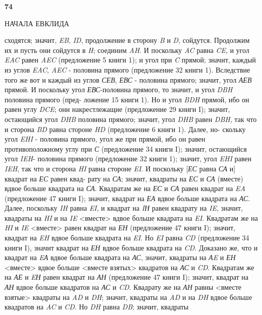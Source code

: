 \documentclass[12pt, a4paper, twoside]{article}
\begin{document}
\bf
74\\
\begin{center}
НАЧАЛА ЕВКЛИДА
\end{center}
сходятся; значит, \textit{EB}, \textit{ID}, продолжение в сторону \textit{B} и \textit{D}, сойдутся. Продолжим их и пусть они сойдутся в \textit{H}; соединим \textit{AH}. И поскольку \textit{AC} равна \textit{CE}, и угол \textit{EAC} равен \textit{AEC} (предложение 5 книги 1); и угол при \textit{C} прямой; значит, каждый из углов \textit{EAC}, \textit{AEC} - половина прямого
(предложение 32 книги 1). Вследствие того же вот и
каждый из углов \textit{СЕВ}, \textit{ЕВС} - половина прямого; значит,
угол \textit{АЕВ} прямой. И поскольку угол \textit{ЕВС}-половина
прямого, то значит, и угол \textit{DBH} половина прямого (пред-
ложение 15 книги 1). Но и угол \textit{BDH} прямой, ибо он
равен углу \textit{DCE}; они накрестлежащие (предложение 29
книги I); значит, остающийся угол \textit{DHB} половина прямого;
значит, угол \textit{DHB} равен \textit{DBH}, так что и сторона \textit{BD}
равна стороне \textit{HD} (предложение 6 книги 1). Далее, но-
скольку угол \textit{EHI} - половина прямого, угол же при
прямой, ибо он равен противоположному углу при \textit{С}
(предложение 34 книги I); значит, остающийся угол \textit{IEH}-
половина прямого (предложение 32 книги 1); значит, угол
\textit{EHI} равен \textit{IEH}, так что и сторона \textit{HI} равна стороне \textit{EI}.
И поскольку [\textit{ЕС} равна \textit{СА} и] квадрат на \textit{ЕС} равен квад-
рату на \textit{СА}; значит, квадраты на \textit{ЕС} и \textit{СА} (вместе) вдвое
больше квадрата на \textit{СА}. Квадратам же на \textit{ЕС} и \textit{СА} равен
квадрат на \textit{EA} (предложение 47 книги I); значит, квадрат
на \textit{ЕА} вдвое больше квадрата на \textit{АС}. Далее, поскольку
\textit{IH} равна \textit{EI}, и квадрат на \textit{IН} равен квадрату на \textit{IE}, значит, квадраты на \textit{HI} и на \textit{IE} <вместе> вдвое больше квадрата на \textit{EI}. Квадратам же на \textit{HI} и \textit{IE} <вместе> равен
квадрат на \textit{ЕН} (предложение 47 книги I); значит, квадрат
на \textit{EH} вдвое больше квадрата на \textit{EI}. Но \textit{EI} равна \textit{CD}
(предложение 34 книги I), значит квадрат на \textit{ЕН} вдвое
больше квадрата на \textit{CD}. Доказано же, что и квадрат на
\textit{EА} вдвое больше квадрата на \textit{АС}, значит, квадраты на \textit{АE}
и \textit{ЕН} <вместе> вдвое больше <вместе взятых> квадратов
на \textit{АС} и \textit{CD}. Квадратам же на \textit{АЕ} и \textit{EН} равен квадрат
на \textit{АН} (предложение 47 книги I); значит, квадрат на \textit{АН}
вдвое больше квадратов на \textit{АС} и \textit{CD}. Квадрату же на \textit{АН}
равны <вместе взятые> квадраты на \textit{AD} и \textit{DH}; значит,
квадраты на \textit{AD} и на \textit{DH} вдвое больше квадратов
на \textit{AC} и \textit{CD}. Но \textit{DH} равна \textit{DB}; значит, квадраты
\end{document}
